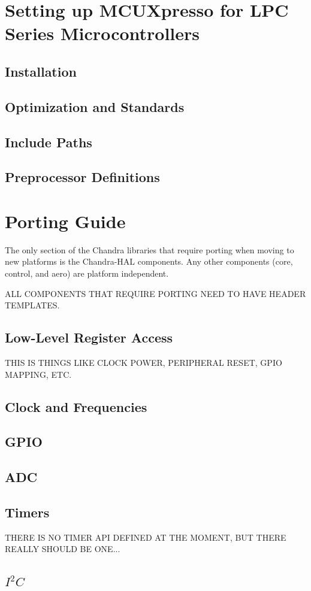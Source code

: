 \documentclass[10pt,letterpaper]{memoir} %
\newcommand{\iic}[0]{$I^{2}C$}
\begin{document}
\chapter{Setting up MCUXpresso for LPC Series Microcontrollers}
\section{Installation}
\section{Optimization and Standards}
\section{Include Paths}
\section{Preprocessor Definitions}

\chapter{Porting Guide}
The only section of the Chandra libraries that require porting when moving to new platforms is the Chandra-HAL components.  Any other components (core, control, and aero) are platform independent.

ALL COMPONENTS THAT REQUIRE PORTING NEED TO HAVE HEADER TEMPLATES.
\section{Low-Level Register Access}
THIS IS THINGS LIKE CLOCK POWER, PERIPHERAL RESET, GPIO MAPPING, ETC.
\section{Clock and Frequencies}
\section{GPIO}
\section{ADC}
\section{Timers}
THERE IS NO TIMER API DEFINED AT THE MOMENT, BUT THERE REALLY SHOULD BE ONE...
\section{\iic}
\end{document}
